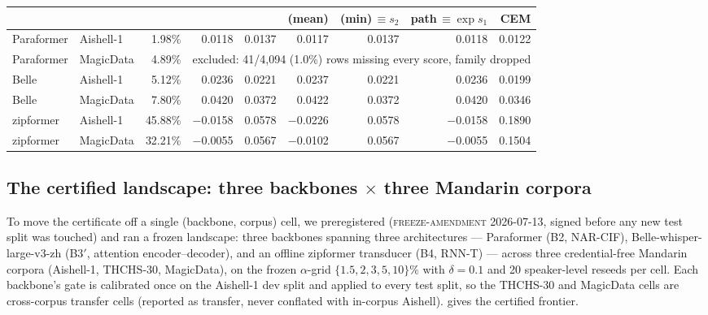 \documentclass[11pt]{article}
\begin{document}
\begin{table}[t]
\begin{tabular}{l l r r r r r r r}
             &        &           &       &       & (mean) & (min)$\,{\equiv}s_2$ & path$\,{\equiv}\exp s_1$ & CEM \\
    \midrule
    Paraformer & Aishell-1  & 1.98\%  & 0.0118 & 0.0137 & 0.0117 & 0.0137 & 0.0118 & 0.0122 \\
    Paraformer & MagicData  & 4.89\%  & \multicolumn{6}{c}{excluded: 41/4{,}094 (1.0\%) rows missing every score, family dropped} \\
    Belle      & Aishell-1  & 5.12\%  & 0.0236 & 0.0221 & 0.0237 & 0.0221 & 0.0236 & 0.0199 \\
    Belle      & MagicData  & 7.80\%  & 0.0420 & 0.0372 & 0.0422 & 0.0372 & 0.0420 & 0.0346 \\
    zipformer  & Aishell-1  & 45.88\% & $-$0.0158 & 0.0578 & $-$0.0226 & 0.0578 & $-$0.0158 & 0.1890 \\
    zipformer  & MagicData  & 32.21\% & $-$0.0055 & 0.0567 & $-$0.0102 & 0.0567 & $-$0.0055 & 0.1504 \\
    \bottomrule
  \end{tabular}
\end{table}

\subsection{The certified landscape: three backbones $\times$ three Mandarin corpora}\label{sec:landscape}

To move the certificate off a single (backbone, corpus) cell, we preregistered
(\textsc{freeze-amendment 2026-07-13}, signed before any new test split was touched) and
ran a frozen landscape: three backbones spanning three architectures --- Paraformer (B2,
NAR-CIF), Belle-whisper-large-v3-zh (B3$'$, attention encoder--decoder), and an offline
zipformer transducer \citep{yao2024zipformer} (B4, RNN-T) --- across three credential-free Mandarin corpora
(Aishell-1, THCHS-30, MagicData), on the frozen $\alpha$-grid $\{1.5,2,3,5,10\}\%$ with
$\delta{=}0.1$ and 20 speaker-level reseeds per cell. Each backbone's gate is calibrated
once on the Aishell-1 dev split and applied to every test split, so the THCHS-30 and
MagicData cells are cross-corpus transfer cells (reported as transfer, never
conflated with in-corpus Aishell).  gives the certified frontier.
\end{document}
